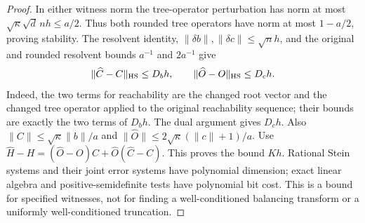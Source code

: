 \begin{proof}
In either witness norm the tree-operator perturbation has norm at most
$\sqrt\kappa\sqrt d\,nh\le a/2$. Thus both rounded tree operators
have norm at most $1-a/2$, proving stability. The resolvent identity,
$\|\delta b\|,\|\delta c\|\le\sqrt n h$, and the original and
rounded resolvent bounds $a^{-1}$ and $2a^{-1}$ give
\[
 \|\widehat C-C\|_{\rm HS}\le D_bh,\qquad
 \|\widehat O-O\|_{\rm HS}\le D_ch.
\]
Indeed, the two terms for reachability are the changed root vector
and the changed tree operator applied to the original reachability
sequence; their bounds are exactly the two terms of $D_bh$.
The dual argument gives $D_ch$. Also
$\|C\|\le\sqrt\kappa\|b\|/a$ and
$\|\widehat O\|\le2\sqrt\kappa(\|c\|+1)/a$.
Use $\widehat H-H=(\widehat O-O)C+\widehat O(\widehat C-C)$.
This proves the bound $Kh$. Rational Stein systems and their joint
error systems have polynomial dimension; exact linear algebra and
positive-semidefinite tests have polynomial bit cost. This is a
bound for specified witnesses, not for finding a well-conditioned
balancing transform or a uniformly well-conditioned truncation.
\end{proof}
